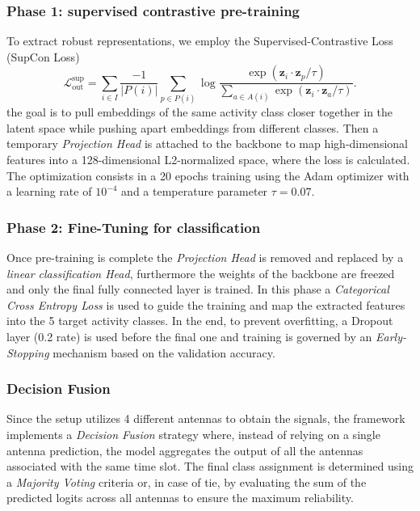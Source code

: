 \subsubsection{Phase 1: supervised contrastive pre-training}
To extract robust representations, we employ the Supervised-Contrastive Loss (SupCon Loss)
\begin{equation}
\mathcal{L}_{\text{out}}^{\text{sup}}
=
\sum_{i\in I}
\frac{-1}{|P(i)|}
\sum_{p\in P(i)}
\log
\frac{
\exp\left(\boldsymbol{z}_i \cdot \boldsymbol{z}_p / \tau\right)
}{
\sum\limits_{a\in A(i)}
\exp\left(\boldsymbol{z}_i \cdot \boldsymbol{z}_a / \tau\right)
}.
\end{equation}
the goal is to pull embeddings of the same activity class closer together in the latent space while pushing apart embeddings from different classes. Then a temporary \textit{Projection Head} is attached to the backbone to map high-dimensional features into a 128-dimensional L2-normalized space, where the loss is calculated. The optimization consists in a 20 epochs training using the Adam optimizer with a learning rate of $10^{-4}$ and a temperature parameter $\tau=0.07$.
\subsubsection{Phase 2: Fine-Tuning for classification}
Once pre-training is complete the \textit{Projection Head} is removed and replaced by a \textit{linear classification Head}, furthermore the weights of the backbone are freezed and only the final fully connected layer is trained. In this phase a \textit{Categorical Cross Entropy Loss} is used to guide the training and map the extracted features into the 5 target activity classes. In the end, to prevent overfitting, a Dropout layer (0.2 rate) is used before the final one and training is governed by an \textit{Early-Stopping} mechanism based on the validation accuracy.
\subsubsection{Decision Fusion}
Since the setup utilizes 4 different antennas to obtain the signals, the framework implements a \textit{Decision Fusion} strategy where, instead of relying on a single antenna prediction, the model aggregates the output of all the antennas associated with the same time slot. The final class assignment is determined using a \textit{Majority Voting} criteria or, in case of tie, by evaluating the sum of the predicted logits across all antennas to ensure the maximum reliability.
\label{sec:processing_architecture}